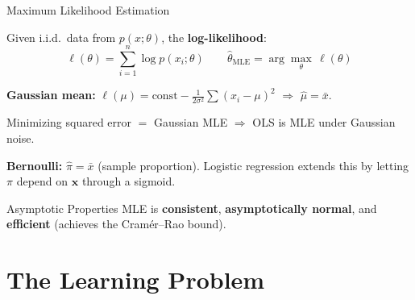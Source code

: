 \documentclass[aspectratio=169, professionalfonts]{beamer}
\begin{document}
\begin{frame}{Maximum Likelihood Estimation}

Given i.i.d.\ data from $p(x; \theta)$, the \textbf{log-likelihood}:
$$\ell(\theta) = \sum_{i=1}^{n} \log p(x_i; \theta) \qquad \hat{\theta}_{\text{MLE}} = \arg\max_\theta\,\ell(\theta)$$

\bigskip

\textbf{Gaussian mean:} $\ell(\mu) = \text{const} - \frac{1}{2\sigma^2}\sum(x_i - \mu)^2$ $\Rightarrow$ $\hat{\mu} = \bar{x}$.

Minimizing squared error $=$ Gaussian MLE $\Rightarrow$ OLS is MLE under Gaussian noise.

\bigskip

\textbf{Bernoulli:} $\hat{\pi} = \bar{x}$ (sample proportion). Logistic regression extends this by letting $\pi$ depend on $\mathbf{x}$ through a sigmoid.

\bigskip

\begin{block}{Asymptotic Properties}
MLE is \textbf{consistent}, \textbf{asymptotically normal}, and \textbf{efficient} (achieves the Cram\'er--Rao bound).
\end{block}

\end{frame}

\section{The Learning Problem}
\end{document}

